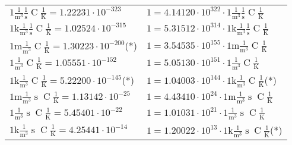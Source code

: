 \begin{center}
\begin{longtable}{l l}
{\color{black}$1 \bm{\mathrm{ }}\frac1{\operatorname{m}^3}\frac1{\operatorname{s}}{\operatorname{C}}\frac1{\operatorname{K}} = 1.22231\cdot10^{-323} $}   & {\color{black}$ 1 = 4.14120\cdot10^{322} \cdot 1 \bm{\mathrm{ }}\frac1{\operatorname{m}^3}\frac1{\operatorname{s}}{\operatorname{C}}\frac1{\operatorname{K}}$}  \\
{\color{gray}$1 \bm{\mathrm{ k}}\frac1{\operatorname{m}^3}\frac1{\operatorname{s}}{\operatorname{C}}\frac1{\operatorname{K}} = 1.02524\cdot10^{-315} $}   & {\color{gray}$ 1 = 5.31512\cdot10^{314} \cdot 1 \bm{\mathrm{ k}}\frac1{\operatorname{m}^3}\frac1{\operatorname{s}}{\operatorname{C}}\frac1{\operatorname{K}}$}  \\
{\color{gray}$1 \bm{\mathrm{ m}}\frac1{\operatorname{m}^3}{}{\operatorname{C}}\frac1{\operatorname{K}} = 1.30223\cdot10^{-200} $}\quad(*) & {\color{gray}$ 1 = 3.54535\cdot10^{155} \cdot 1 \bm{\mathrm{ m}}\frac1{\operatorname{m}^3}{}{\operatorname{C}}\frac1{\operatorname{K}}$}  \\
{\color{black}$1 \bm{\mathrm{ }}\frac1{\operatorname{m}^3}{}{\operatorname{C}}\frac1{\operatorname{K}} = 1.05551\cdot10^{-152} $}   & {\color{black}$ 1 = 5.05130\cdot10^{151} \cdot 1 \bm{\mathrm{ }}\frac1{\operatorname{m}^3}{}{\operatorname{C}}\frac1{\operatorname{K}}$}  \\
{\color{gray}$1 \bm{\mathrm{ k}}\frac1{\operatorname{m}^3}{}{\operatorname{C}}\frac1{\operatorname{K}} = 5.22200\cdot10^{-145} $}\quad(*) & {\color{gray}$ 1 = 1.04003\cdot10^{144} \cdot 1 \bm{\mathrm{ k}}\frac1{\operatorname{m}^3}{}{\operatorname{C}}\frac1{\operatorname{K}}$}\quad(*)\\
{\color{gray}$1 \bm{\mathrm{ m}}\frac1{\operatorname{m}^3}{\operatorname{s}}{\operatorname{C}}\frac1{\operatorname{K}} = 1.13142\cdot10^{-25} $}   & {\color{gray}$ 1 = 4.43410\cdot10^{24} \cdot 1 \bm{\mathrm{ m}}\frac1{\operatorname{m}^3}{\operatorname{s}}{\operatorname{C}}\frac1{\operatorname{K}}$}  \\
{\color{black}$1 \bm{\mathrm{ }}\frac1{\operatorname{m}^3}{\operatorname{s}}{\operatorname{C}}\frac1{\operatorname{K}} = 5.45401\cdot10^{-22} $}   & {\color{black}$ 1 = 1.01031\cdot10^{21} \cdot 1 \bm{\mathrm{ }}\frac1{\operatorname{m}^3}{\operatorname{s}}{\operatorname{C}}\frac1{\operatorname{K}}$}  \\
{\color{gray}$1 \bm{\mathrm{ k}}\frac1{\operatorname{m}^3}{\operatorname{s}}{\operatorname{C}}\frac1{\operatorname{K}} = 4.25441\cdot10^{-14} $}   & {\color{gray}$ 1 = 1.20022\cdot10^{13} \cdot 1 \bm{\mathrm{ k}}\frac1{\operatorname{m}^3}{\operatorname{s}}{\operatorname{C}}\frac1{\operatorname{K}}$}\quad(*)\\

\end{longtable}
\end{center}
